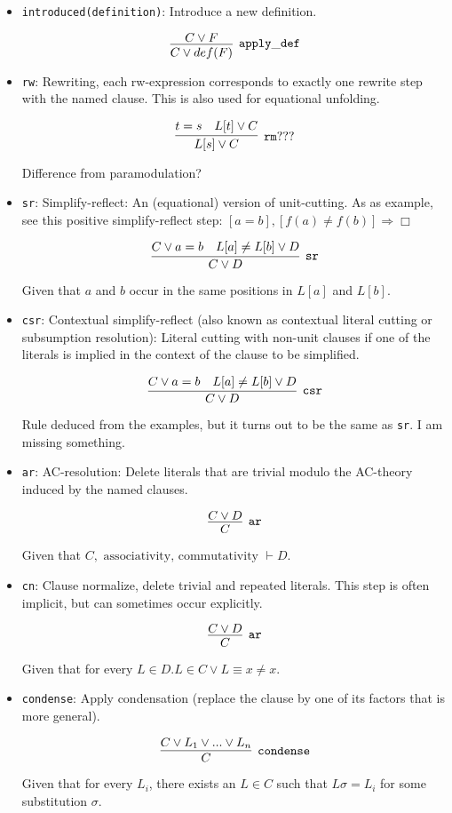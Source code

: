 \documentclass[a4paper, 11pt]{article}
\begin{document}
\begin{itemize}
\item \texttt{introduced(definition)}: 
  Introduce a new definition.

  \[
  \infer[\mathtt{apply\_def}]{C \vee def(F)}{
    C \vee F
  }
  \]

\item \texttt{rw}: 
  Rewriting, each rw-expression corresponds to exactly one
  rewrite step with the named clause. This is also used for equational unfolding.

  \[
  \infer[\mathtt{rm}???]{L[s] \vee C}{
    t = s &
    L[t] \vee C
  }
  \]
  
  {\color{red}Difference from paramodulation?}

\item \texttt{sr}: 
  Simplify-reflect: An (equational) version of unit-cutting. As
  as example, see this positive simplify-reflect step: 
  \newline
  $[a = b], [f(a) \neq f(b)] \Rightarrow \Box $

  \[
  \infer[\mathtt{sr}]{C \vee D}{
    C \vee a = b &
    L[a] \neq L[b] \vee D
  }
  \]
  
  Given that $a$ and $b$ occur in the same positions in $L[a]$ and $L[b]$.

\item \texttt{csr}: 
  Contextual simplify-reflect (also known as contextual
  literal cutting or subsumption resolution): Literal cutting with non-unit
  clauses if one of the literals is implied in the context of the clause to be
  simplified.

  \[
  \infer[\mathtt{csr}]{C \vee D}{
    C \vee a = b &
    L[a] \neq L[b] \vee D
  }
  \]

  {\color{red}Rule deduced from the examples, but it turns out to be the same as
  \texttt{sr}. I am missing something.}

\item \texttt{ar}: 
  AC-resolution: Delete literals that are trivial modulo the
  AC-theory induced by the named clauses.

  \[
  \infer[\mathtt{ar}]{C}{C \vee D}
  \]

  Given that $C, \mbox{ associativity, commutativity } \vdash D$.

\item \texttt{cn}: 
  Clause normalize, delete trivial and repeated literals. This
  step is often implicit, but can sometimes occur explicitly.

  \[
  \infer[\mathtt{ar}]{C}{C \vee D}
  \]

  Given that for every $L \in D. L \in C \vee L \equiv x \neq x$.

\item \texttt{condense}:
  Apply condensation (replace the clause by one of its factors that is more
  general).

  \[
  \infer[\mathtt{condense}]{C}{C \vee L_1 \vee ... \vee L_n}
  \]

  Given that for every $L_i$, there exists an $L \in C$ such that $L\sigma =
  L_i$ for some substitution $\sigma$.

\end{itemize}
\end{document}
